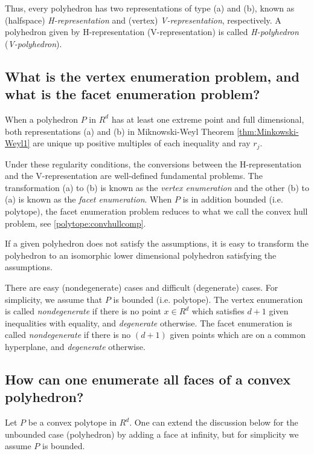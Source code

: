 \documentclass[a4paper,12pt]{article}
\begin{document}
Thus, every polyhedron has two representations of type (a) and (b),
known as (halfspace) {\em H-representation\/} and (vertex) 
{\em V-representation\/},
respectively.   A polyhedron given by H-representation (V-representation)
is called {\em H-polyhedron} ({\em V-polyhedron}).

\subsection{What is the vertex enumeration problem, and what is the facet enumeration
 problem?} \label{polytope:repconv}

When a polyhedron $P$ in $R^d$ has at least one extreme point and full dimensional,
both representations (a) and (b)  in Miknowski-Weyl 
Theorem \ref{thm:Minkowski-Weyl1}  are  unique up
positive multiples of each inequality and ray $r_j$.  

Under these regularity conditions, the conversions between the H-representation
and the V-representation are well-defined fundamental problems.
The transformation (a) to (b) is known as the {\em vertex enumeration\/}
and the other (b) to (a) is known as the {\em facet enumeration\/}.
When $P$ is in addition bounded (i.e. polytope), the facet enumeration problem
reduces to
what we call the convex hull problem, see \ref{polytope:convhullcomp}.

If a given polyhedron does not satisfy the assumptions, it is easy to
transform the polyhedron to an isomorphic lower dimensional
polyhedron satisfying the assumptions. 

There are easy (nondegenerate) cases and difficult  (degenerate) cases.
For simplicity, we assume that $P$ is  bounded (i.e. polytope).
The vertex enumeration is called {\em nondegenerate\/} if
there is no point $x \in R^d$ which satisfies $d+1$ given inequalities
with equality, and {\em degenerate\/} otherwise.
The facet enumeration
is called {\em nondegenerate\/} if
there is no $(d+1)$ given points  which are on a common
hyperplane, and {\em degenerate\/} otherwise.

\subsection{How can one enumerate all faces of a convex polyhedron?} \label{polytope:faceenum}

Let $P$ be a convex polytope in $R^d$.  One can extend the
discussion below for the unbounded case (polyhedron) by adding
a face at infinity, but for simplicity we assume $P$ is bounded.
\end{document}
